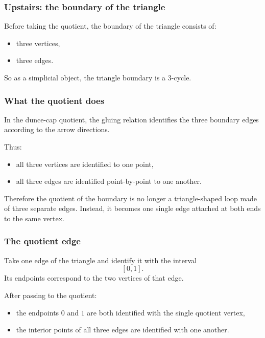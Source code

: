 \documentclass[12pt,a4paper]{article}
\theoremstyle{notespace}
\begin{document}
\subsubsection{Upstairs: the boundary of the triangle}

Before taking the quotient, the boundary of the triangle consists of:

\begin{itemize}
	\item three vertices,
	\item three edges.
\end{itemize}

So as a simplicial object, the triangle boundary is a 3-cycle.

\subsubsection{What the quotient does}

In the dunce-cap quotient, the gluing relation identifies the three boundary edges according to the arrow directions.

Thus:

\begin{itemize}
	\item all three vertices are identified to one point,
	\item all three edges are identified point-by-point to one another.
\end{itemize}

Therefore the quotient of the boundary is no longer a triangle-shaped loop made of three separate edges. Instead, it becomes one single edge attached at both ends to the same vertex.

\subsubsection{The quotient edge}

Take one edge of the triangle and identify it with the interval
\[
[0,1].
\]
Its endpoints correspond to the two vertices of that edge.

After passing to the quotient:

\begin{itemize}
	\item the endpoints \(0\) and \(1\) are both identified with the single quotient vertex,
	\item the interior points of all three edges are identified with one another.
\end{itemize}
\end{document}
